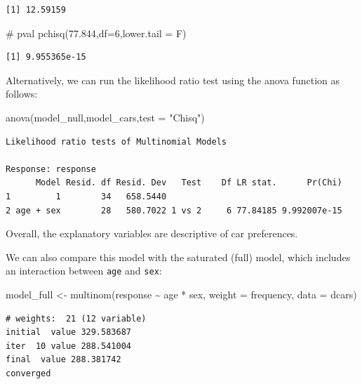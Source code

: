 \documentclass[
  letterpaper,
  DIV=11,
  numbers=noendperiod]{scrartcl}
\newenvironment{Shaded}{\begin{snugshade}}{\end{snugshade}}
\newcommand{\AttributeTok}[1]{\textcolor[rgb]{0.40,0.45,0.13}{#1}}
\newcommand{\CommentTok}[1]{\textcolor[rgb]{0.37,0.37,0.37}{#1}}
\newcommand{\DecValTok}[1]{\textcolor[rgb]{0.68,0.00,0.00}{#1}}
\newcommand{\FloatTok}[1]{\textcolor[rgb]{0.68,0.00,0.00}{#1}}
\newcommand{\FunctionTok}[1]{\textcolor[rgb]{0.28,0.35,0.67}{#1}}
\newcommand{\NormalTok}[1]{\textcolor[rgb]{0.00,0.23,0.31}{#1}}
\newcommand{\OtherTok}[1]{\textcolor[rgb]{0.00,0.23,0.31}{#1}}
\newcommand{\SpecialCharTok}[1]{\textcolor[rgb]{0.37,0.37,0.37}{#1}}
\newcommand{\StringTok}[1]{\textcolor[rgb]{0.13,0.47,0.30}{#1}}
\begin{document}
\begin{verbatim}
[1] 12.59159
\end{verbatim}

\begin{Shaded}
\begin{Highlighting}[]
\CommentTok{\# pval}
\FunctionTok{pchisq}\NormalTok{(}\FloatTok{77.844}\NormalTok{,}\AttributeTok{df=}\DecValTok{6}\NormalTok{,}\AttributeTok{lower.tail =}\NormalTok{ F)}
\end{Highlighting}
\end{Shaded}

\begin{verbatim}
[1] 9.955365e-15
\end{verbatim}

Alternatively, we can run the likelihood ratio test using the anova
function as follows:

\begin{Shaded}
\begin{Highlighting}[]
\FunctionTok{anova}\NormalTok{(model\_null,model\_cars,}\AttributeTok{test =} \StringTok{"Chisq"}\NormalTok{)}
\end{Highlighting}
\end{Shaded}

\begin{verbatim}
Likelihood ratio tests of Multinomial Models

Response: response
      Model Resid. df Resid. Dev   Test    Df LR stat.      Pr(Chi)
1         1        34   658.5440                                   
2 age + sex        28   580.7022 1 vs 2     6 77.84185 9.992007e-15
\end{verbatim}

Overall, the explanatory variables are descriptive of car preferences.

We can also compare this model with the saturated (full) model, which
includes an interaction between \texttt{age} and \texttt{sex}:

\begin{Shaded}
\begin{Highlighting}[]
\NormalTok{model\_full }\OtherTok{\textless{}{-}} \FunctionTok{multinom}\NormalTok{(response }\SpecialCharTok{\textasciitilde{}}\NormalTok{ age }\SpecialCharTok{*}\NormalTok{ sex, }\AttributeTok{weight =}\NormalTok{ frequency, }\AttributeTok{data =}\NormalTok{ dcars)}
\end{Highlighting}
\end{Shaded}

\begin{verbatim}
# weights:  21 (12 variable)
initial  value 329.583687 
iter  10 value 288.541004
final  value 288.381742 
converged
\end{verbatim}
\end{document}
